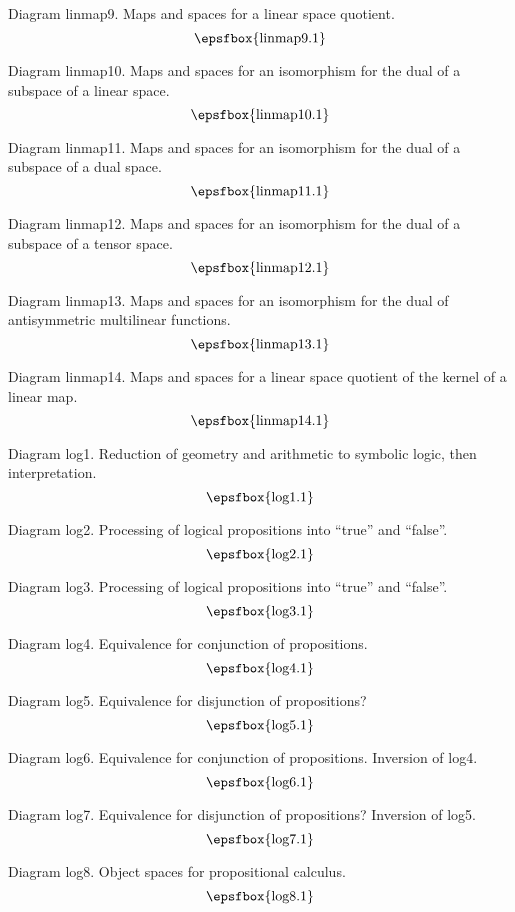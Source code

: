 Diagram linmap9. Maps and spaces for a linear space quotient.
$$
\centerline{\epsfbox{linmap9.1}}
$$

Diagram linmap10. Maps and spaces for an isomorphism for the dual of a subspace
of a linear space.
$$
\centerline{\epsfbox{linmap10.1}}
$$

Diagram linmap11. Maps and spaces for an isomorphism for the dual of a subspace
of a dual space.
$$
\centerline{\epsfbox{linmap11.1}}
$$

\filleject

Diagram linmap12. Maps and spaces for an isomorphism for the dual of a subspace
of a tensor space.
$$
\centerline{\epsfbox{linmap12.1}}
$$

Diagram linmap13. Maps and spaces for an isomorphism for the dual of
antisymmetric multilinear functions.
$$
\centerline{\epsfbox{linmap13.1}}
$$

Diagram linmap14. Maps and spaces for a linear space quotient of the kernel of a
linear map.
$$
\centerline{\epsfbox{linmap14.1}}
$$

\secteject
\edef\SECTlog{\the\pageno}

Diagram log1. Reduction of geometry and arithmetic to symbolic logic, then
interpretation.
$$
\centerline{\epsfbox{log1.1}}
$$

Diagram log2. Processing of logical propositions into ``true'' and ``false''.
$$
\centerline{\epsfbox{log2.1}}
$$

Diagram log3. Processing of logical propositions into ``true'' and ``false''.
$$
\centerline{\epsfbox{log3.1}}
$$

Diagram log4. Equivalence for conjunction of propositions.
$$
\centerline{\epsfbox{log4.1}}
$$

Diagram log5. Equivalence for disjunction of propositions?
$$
\centerline{\epsfbox{log5.1}}
$$

\filleject

Diagram log6. Equivalence for conjunction of propositions. Inversion of
log4.
$$
\centerline{\epsfbox{log6.1}}
$$

Diagram log7. Equivalence for disjunction of propositions? Inversion of
log5.
$$
\centerline{\epsfbox{log7.1}}
$$

Diagram log8. Object spaces for propositional calculus.
$$
\centerline{\epsfbox{log8.1}}
$$

